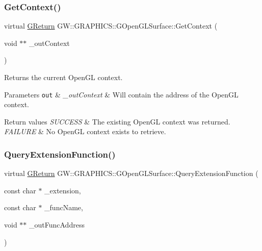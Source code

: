 \subsubsection{\texorpdfstring{Get\+Context()}{GetContext()}}
{\footnotesize\ttfamily virtual \mbox{\hyperlink{namespace_g_w_a67a839e3df7ea8a5c5686613a7a3de21}{G\+Return}} G\+W\+::\+G\+R\+A\+P\+H\+I\+C\+S\+::\+G\+Open\+G\+L\+Surface\+::\+Get\+Context (\begin{DoxyParamCaption}\item[{void $\ast$$\ast$}]{\+\_\+out\+Context }\end{DoxyParamCaption})\hspace{0.3cm}{\ttfamily [pure virtual]}}



Returns the current Open\+GL context. 


\begin{DoxyParams}[1]{Parameters}
\mbox{\tt out}  & {\em \+\_\+out\+Context} & Will contain the address of the Open\+GL context.\\
\hline
\end{DoxyParams}

\begin{DoxyRetVals}{Return values}
{\em S\+U\+C\+C\+E\+SS} & The existing Open\+GL context was returned. \\
\hline
{\em F\+A\+I\+L\+U\+RE} & No Open\+GL context exists to retrieve. \\
\hline
\end{DoxyRetVals}
\mbox{\label{class_g_w_1_1_g_r_a_p_h_i_c_s_1_1_g_open_g_l_surface_a045548083dbdd547b18ef9b9a896f0de}} 
\subsubsection{\texorpdfstring{Query\+Extension\+Function()}{QueryExtensionFunction()}}
{\footnotesize\ttfamily virtual \mbox{\hyperlink{namespace_g_w_a67a839e3df7ea8a5c5686613a7a3de21}{G\+Return}} G\+W\+::\+G\+R\+A\+P\+H\+I\+C\+S\+::\+G\+Open\+G\+L\+Surface\+::\+Query\+Extension\+Function (\begin{DoxyParamCaption}\item[{const char $\ast$}]{\+\_\+extension,  }\item[{const char $\ast$}]{\+\_\+func\+Name,  }\item[{void $\ast$$\ast$}]{\+\_\+out\+Func\+Address }\end{DoxyParamCaption})\hspace{0.3cm}{\ttfamily [pure virtual]}}



